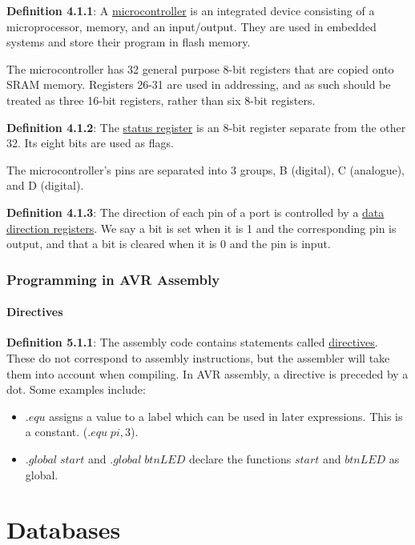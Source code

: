 \documentclass{article}
\newcommand{\separate}[1] {\vspace{#1 pt}\noindent}
\newcommand{\definition}[2]{\textbf{Definition #1}: #2\label{def:#1}}
\begin{document}
\definition{4.1.1}{A \underline{microcontroller} is an integrated device consisting of a microprocessor, memory, and an input/output. They are used in embedded systems and store their program in flash memory.}

\separate{5}The microcontroller has 32 general purpose 8-bit registers that are copied onto SRAM memory. Registers 26-31 are used in addressing, and as such should be treated as three 16-bit registers, rather than six 8-bit registers.

\separate{5}\definition{4.1.2}{The \underline{status register} is an 8-bit register separate from the other 32. Its eight bits are used as flags.}

\separate{5}The microcontroller's pins are separated into 3 groups, B (digital), C (analogue), and D (digital). 

\separate{5}\definition{4.1.3}{The direction of each pin of a port is controlled by a \underline{data direction registers}. We say a bit is set when it is 1 and the corresponding pin is output, and that a bit is cleared when it is 0 and the pin is input.}

\section{Programming in AVR Assembly}

\subsection{Directives}

\definition{5.1.1}{The assembly code contains statements called \underline{directives}. These do not correspond to assembly instructions, but the assembler will take them into account when compiling. In AVR assembly, a directive is preceded by a dot. Some examples include:}
\begin{itemize}
    \item \(.equ\) assigns a value to a label which can be used in later expressions. This is a constant. (\(.equ\;pi, 3\)).
    \item \(.global\;start\) and \(.global\;btnLED\) declare the functions \(start\) and \(btnLED\) as global.
\end{itemize}

\newpage\part{Databases}\label{part:3.db}
\end{document}
